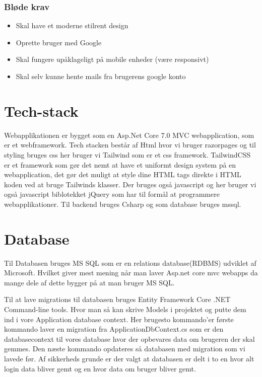 \subsubsection{Bløde krav}
\begin{itemize}
    \item Skal have et moderne stilrent design
    \item Oprette bruger med Google
    \item Skal fungere upåklageligt på mobile enheder (være responsivt)
    \item Skal selv kunne hente mails fra brugerens google konto
\end{itemize}
\section{Tech-stack}
Webapplikationen er bygget som en Asp.Net Core 7.0 MVC webapplication, som er et webframework. Tech stacken består af Html hvor vi bruger razorpages og til styling bruges css her bruger vi Tailwind som er et
css framework. TailwindCSS er et framework som gør det nemt at have et uniformt design system på en webapplication, 
det gør det muligt at style dine HTML tags direkte i HTML koden ved at bruge Tailwinds klasser. Der bruges også javascript 
og her bruger vi også javascript biblotekket jQuery som har til formål
at programmere webapplikationer. Til backend bruges Csharp og som database bruges mssql. 
\section{Database}
Til Databasen bruges MS SQL som er en relations database(RDBMS) udviklet af Microsoft. Hvilket
giver mest mening når man laver Asp.net core mvc webapps da mange dele af dette bygger på at man bruger
MS SQL.

Til at lave migrations til databasen bruges Entity Framework Core .NET Command-line tools. 
Hvor man så kan skrive Models i projektet og putte dem ind i vore Application database 
context. Her brugesto kommando'er første kommando laver en migration fra ApplicationDbContext.cs 
som er den databasecontext til vores database hvor der opbevares data om brugeren der skal gemmes. 
Den næste kommando opdateres så databasen med migration som vi lavede før. Af sikkerheds grunde er der 
valgt at databasen er delt i to en hvor alt login data bliver gemt og en hvor data om bruger bliver gemt.


